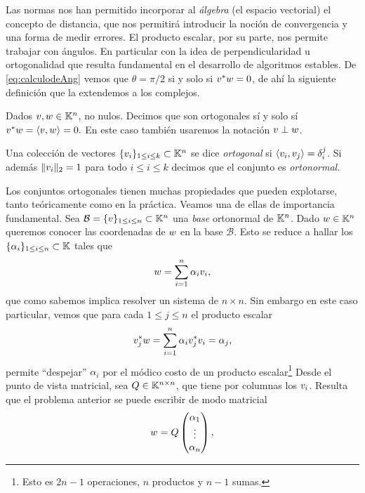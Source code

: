\tcc
Las normas nos han permitido incorporar al \emph{álgebra} (el espacio vectorial) el concepto de distancia, que  nos permitirá introducir la noción de convergencia y una forma de medir errores.  El producto escalar, por su parte, nos permite trabajar con ángulos. En particular con la idea de perpendicularidad u ortogonalidad que resulta  fundamental en el desarrollo de algoritmos estables.
\etcc
De \eqref{eq:calculodeAng} vemos que $\theta=\pi/2$ si y solo si $\vb^*\wb=0$, de ahí la siguiente definición que la extendemos a los complejos.
\tccdefi
\begin{defi}
 Dados $\vb,\wb\in\K^n$, no nulos. Decimos que son ortogonales sí y solo sí  $\vb^*\wb=\langle \vb,\wb\rangle=0.$ En este caso también usaremos la notación $\vb\perp \wb$.
\end{defi}
\etcc
\tccdefi
\begin{defi}
 Una colección de vectores  $\{\vb_i\}_{1\le i\le k}\subset \K^{n}$ se dice \emph{ortogonal} si $\langle \vb_i,\vb_j\rangle =\delta_i^j$. Si además $\|\vb_i\|_2=1$ para todo $i\le i\le k$ decimos que el conjunto es \emph{ortonormal.}
\end{defi}
\etcc
Los conjuntos ortogonales tienen muchas propiedades que pueden explotarse, tanto teóricamente como en la práctica. Veamos una de ellas de importancia fundamental. Sea $\mathcal{B}=\{\vb\}_{1\le i\le n}\subset \K^n$ una \emph{base} ortonormal de $\mathbb K^n$. Dado $\wb\in \K^n$ queremos conocer las coordenadas de $\wb$ en la base $\mathcal{B}$. Esto se reduce a hallar los  $\{\alpha_i\}_{1\le i\le n}\subset \mathbb K$ tales que
\begin{equation}
\label{eq:escritura_ort}
\wb=\sum_{i=1}^n\alpha_i\vb_i,
\end{equation}
que como sabemos implica resolver un sistema de $n\times n$. Sin embargo en este caso particular, vemos que para cada $1\le j\le n$ el producto escalar
\begin{equation}
\label{eq:proyecciones}
\vb_j^*\wb=\sum_{i=1}^n\alpha_i\vb_j^*\vb_i=\alpha_j,
\end{equation}
permite ``despejar'' $\alpha_i$ por el módico costo de un producto escalar\footnote{Esto es $2n-1$ operaciones, $n$ productos y $n-1$ sumas.}
Desde el punto de vista matricial, sea $\Qb\in \K^{n\times n}$, que tiene por columnas los $\vb_i$. Resulta que el problema anterior se puede escribir de modo matricial
$$
\wb=\Qb\begin{pmatrix}
        \alpha_1\\
        \vdots\\
        \alpha_n
       \end{pmatrix},
$$
